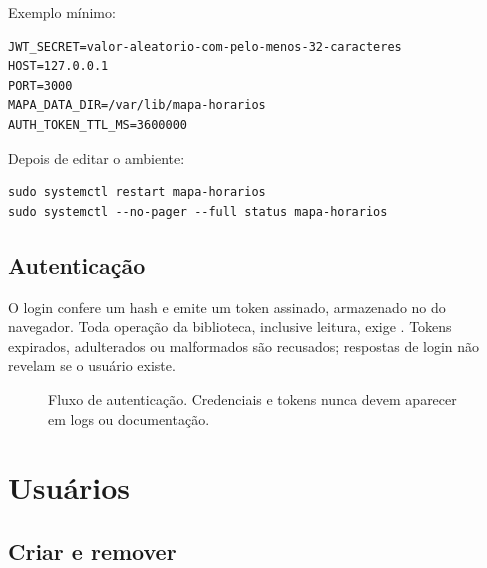 Exemplo mínimo:

\begin{lstlisting}
JWT_SECRET=valor-aleatorio-com-pelo-menos-32-caracteres
HOST=127.0.0.1
PORT=3000
MAPA_DATA_DIR=/var/lib/mapa-horarios
AUTH_TOKEN_TTL_MS=3600000
\end{lstlisting}

Depois de editar o ambiente:

\begin{lstlisting}
sudo systemctl restart mapa-horarios
sudo systemctl --no-pager --full status mapa-horarios
\end{lstlisting}

\section{Autenticação}

O login confere um hash  e emite um token assinado, armazenado no  do navegador. Toda operação da biblioteca, inclusive leitura, exige . Tokens expirados, adulterados ou malformados são recusados; respostas de login não revelam se o usuário existe.

\begin{figure}[H]
\centering
{}
\caption{Fluxo de autenticação. Credenciais e tokens nunca devem aparecer em logs ou documentação.}
\label{fig:admin-auth}
\end{figure}

\chapter{Usuários}

\section{Criar e remover}

